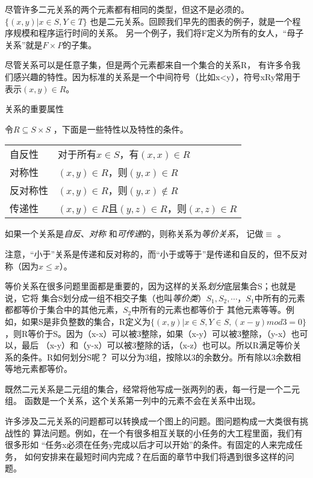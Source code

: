 尽管许多二元关系的两个元素都有相同的类型，但这不是必须的。$\{ (x,
y)| x\in S, Y\in T\}$
也是二元关系。回顾我们早先的图表的例子，就是一个程序规模和程序运行时间的关系。
另一个例子，我们将F定义为所有的女人，“母子关系”就是$F \times
P$的子集。

尽管关系可以是任意子集，但是两个元素都来自一个集合的关系R，
有许多令我们感兴趣的特性。因为标准的关系是一个中间符号（比如x<y），符号xRy常用于表示$(x,
y) \in R$。

\begin{definition} \label{Def:RelationAndAttribute}
    关系的重要属性

    令$R \subseteq S \times S$ ，下面是一些特性以及特性的条件。

    \begin{tabular}{ll}
        自反性& 对于所有$x\in S$，有$(x, x)\in R$\\
        对称性& $(x, y)\in R$，则$(y, x)\in R$ \\
        反对称性&        $(x, y)\in R$，则$(y, x) \not\in R$\\
        传递性&  $(x, y)\in R$且$(y, z)\in R$，则$(x, z)\in R$
    \end{tabular}

    如果一个关系是\emph{自反}、\emph{对称}  和\emph{可传递}的，则称关系为\emph{等价关系}，
    记做$\equiv$ 。
\end{definition}

注意，“小于”关系是传递和反对称的，而“小于或等于”是传递和自反的，但不反对称（因为$x
\leq x$）。

等价关系在很多问题里面都是重要的，因为这样的关系\emph{划分}底层集合S；也就是说，它将
集合S划分成一组不相交子集（也叫\emph{等价类}）$S_1, S_2,
\cdots$，$S_1$中所有的元素都都等价于集合中的其他元素，$S_2$中所有的元素也都等价于
其他元素等等。例如，如果S是非负整数的集合，R定义为$\{ (x, y)| x\in
S, Y\in S, (x-y) mod 3 =0\}$
，则R等价于S。因为（x-x）可以被3整除，如果（x-y）可以被3整除，（y-x）也可以，最后
（x-y）和（y-x）可以被3整除的话，（x-z）也可以。所以R满足等价关系的条件。R如何划分S呢？
可以分为3组，按除以3的余数分。所有除以3余数相等地元素都等价。

既然二元关系是二元组的集合，经常将他写成一张两列的表，每一行是一个二元组。
函数是一个关系，这个关系第一列中的元素不会在关系中出现。

许多涉及二元关系的问题都可以转换成一个图上的问题。图问题构成一大类很有挑战性的
算法问题。例如，在一个有很多相互关联的小任务的大工程里面，我们有很多形如
“任务x必须在任务y完成以后才可以开始”的条件。有固定的人来完成任务，
如何安排来在最短时间内完成？在后面的章节中我们将遇到很多这样的问题。

